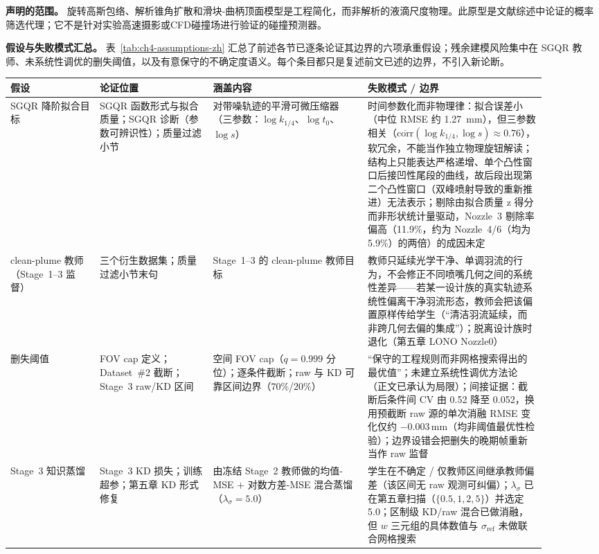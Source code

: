 \textbf{声明的范围。} 旋转高斯包络、解析锥角扩散和滑块-曲柄顶面模型是工程简化，而非解析的液滴尺度物理。此原型是文献综述中论证的概率筛选代理；它不是针对实验高速摄影或CFD碰撞场进行验证的碰撞预测器。

\textbf{假设与失败模式汇总。} 表~\ref{tab:ch4-assumptions-zh} 汇总了前述各节已逐条论证其边界的六项承重假设；残余建模风险集中在 SGQR 教师、未系统性调优的删失阈值，以及有意保守的不确定度语义。每个条目都只是复述前文已述的边界，不引入新论断。

\begin{table}[H]
\centering
\scriptsize
\setlength{\tabcolsep}{4pt}
\renewcommand{\arraystretch}{1.25}
\begin{tabular}{@{}L{0.15\linewidth}L{0.19\linewidth}L{0.26\linewidth}L{0.30\linewidth}@{}}
\toprule
假设 & 论证位置 & 涵盖内容 & 失败模式 / 边界 \\
\midrule
SGQR 降阶拟合目标 & SGQR 函数形式与拟合质量；SGQR 诊断（参数可辨识性）；质量过滤小节 & 对带噪轨迹的平滑可微压缩器（三参数：$\log k_{1/4}$、$\log t_0$、$\log s$） & 时间参数化而非物理律：拟合误差小（中位 RMSE 约 \SI{1.27}{mm}），但三参数相关（$\overline{\mathrm{corr}}(\log k_{1/4},\log s)\approx0.76$），软冗余，不能当作独立物理旋钮解读；结构上只能表达严格递增、单个凸性窗口后接凹性尾段的曲线，故后段出现第二个凸性窗口（双峰喷射导致的重新推进）无法表示；剔除由拟合质量 z 得分而非形状统计量驱动，Nozzle~3 剔除率偏高（11.9\%，约为 Nozzle~4/6（均为 5.9\%）的两倍）的成因未定 \\
\addlinespace
clean-plume 教师（Stage~1--3 监督） & 三个衍生数据集；质量过滤小节末句 & Stage~1--3 的 clean-plume 教师目标 & 教师只延续光学干净、单调羽流的行为，不会修正不同喷嘴几何之间的系统性差异——若某一设计族的真实轨迹系统性偏离干净羽流形态，教师会把该偏置原样传给学生（``清洁羽流延续，而非跨几何去偏的集成''）；脱离设计族时退化（第五章 LONO Nozzle0） \\
\addlinespace
删失阈值 & FOV cap 定义；Dataset~\#2 截断；Stage~3 raw/KD 区间 & 空间 FOV cap（$q=0.999$ 分位）；逐条件截断；raw 与 KD 可靠区间边界（$70\%$/$20\%$） & ``保守的工程规则而非网格搜索得出的最优值''；未建立系统性调优方法论（正文已承认为局限）；间接证据：截断后条件间 CV 由 0.52 降至 0.052，换用预截断 raw 源的单次消融 RMSE 变化仅约 $-0.003$\,mm（均非阈值最优性检验）；边界设错会把删失的晚期帧重新当作 raw 监督 \\
\addlinespace
Stage~3 知识蒸馏 & Stage~3 KD 损失；训练超参；第五章 KD 形式修复 & 由冻结 Stage~2 教师做的均值-MSE $+$ 对数方差-MSE 混合蒸馏（$\lambda_\sigma=5.0$） & 学生在不确定 / 仅教师区间继承教师偏差（该区间无 raw 观测可纠偏）；$\lambda_\sigma$ 已在第五章扫描（$\{0.5,1,2,5\}$）并选定 5.0；区制级 KD/raw 混合已做消融，但 $w$ 三元组的具体数值与 $\sigma_{\mathrm{ref}}$ 未做联合网格搜索 \\

\end{tabular}
\end{table}
